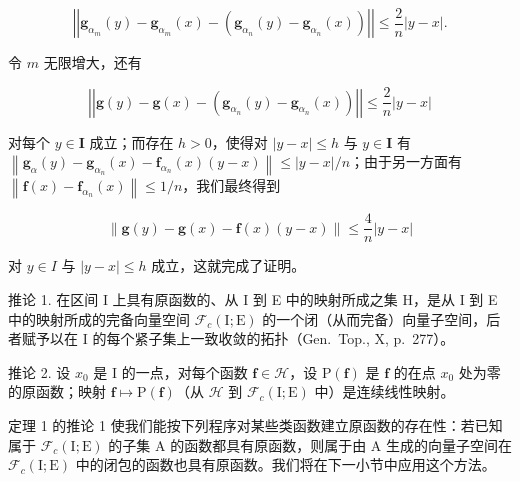 \[
\left| \left| \mathbf {g} _ {\alpha_ {m}} (y) - \mathbf {g} _ {\alpha_ {m}} (x) - \left(\mathbf {g} _ {\alpha_ {n}} (y) - \mathbf {g} _ {\alpha_ {n}} (x)\right) \right| \right| \leqslant \frac {2}{n} | y - x |.
\]

令 \(m\) 无限增大，还有

\[
\left| \left| \mathbf {g} (y) - \mathbf {g} (x) - \left(\mathbf {g} _ {\alpha_ {n}} (y) - \mathbf {g} _ {\alpha_ {n}} (x)\right) \right| \right| \leqslant \frac {2}{n} | y - x |
\]

对每个 \(y \in \mathbf{I}\) 成立；而存在 \(h > 0\)，使得对 \(|y - x| \leqslant h\) 与 \(y \in \mathbf{I}\) 有 \(\left\| \mathbf{g}_{\alpha}(y) - \mathbf{g}_{\alpha_n}(x) - \mathbf{f}_{\alpha_n}(x)(y - x) \right\| \leqslant |y - x| / n\)；由于另一方面有 \(\left\| \mathbf{f}(x) - \mathbf{f}_{\alpha_n}(x) \right\| \leqslant 1 / n\)，我们最终得到

\[
\| \mathbf {g} (y) - \mathbf {g} (x) - \mathbf {f} (x) (y - x) \| \leqslant \frac {4}{n} | y - x |
\]

对 \(y \in I\) 与 \(|y - x| \leqslant h\) 成立，这就完成了证明。

推论 1. 在区间 I 上具有原函数的、从 I 到 E 中的映射所成之集 H，是从 I 到 E 中的映射所成的完备向量空间 \(\mathcal{F}_{c}(\mathrm{I};\mathrm{E})\) 的一个闭（从而完备）向量子空间，后者赋予以在 I 的每个紧子集上一致收敛的拓扑（Gen.~Top., X, p.~277）。

推论 2. 设 \(x_0\) 是 I 的一点，对每个函数 \(\mathbf{f} \in \mathcal{H}\)，设 \(\mathrm{P}(\mathbf{f})\) 是 \(\mathbf{f}\) 的在点 \(x_0\) 处为零的原函数；映射 \(\mathbf{f} \mapsto \mathrm{P}(\mathbf{f})\)（从 \(\mathcal{H}\) 到 \(\mathcal{F}_c(\mathrm{I};\mathrm{E})\) 中）是连续线性映射。

定理 1 的推论 1 使我们能按下列程序对某些类函数建立原函数的存在性：若已知属于 \(\mathcal{F}_{c}(\mathrm{I};\mathrm{E})\) 的子集 A 的函数都具有原函数，则属于由 A 生成的向量子空间在 \(\mathcal{F}_{c}(\mathrm{I};\mathrm{E})\) 中的闭包的函数也具有原函数。我们将在下一小节中应用这个方法。

